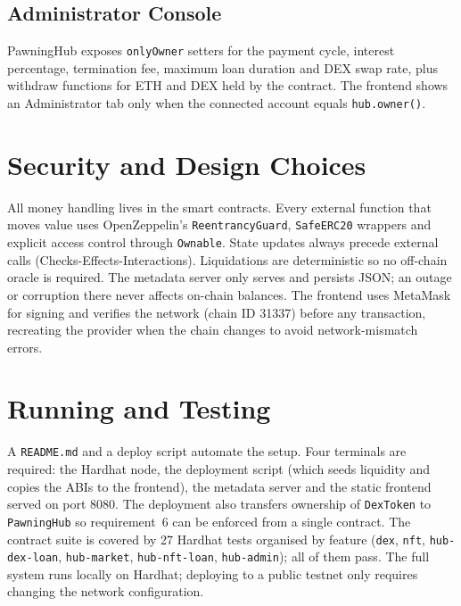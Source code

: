 \documentclass[12pt,a4paper]{article}
\begin{document}
\subsection{Administrator Console}
PawningHub exposes \texttt{onlyOwner} setters for the payment cycle, interest percentage, termination fee, maximum loan duration and DEX swap rate, plus withdraw functions for ETH and DEX held by the contract. The frontend shows an Administrator tab only when the connected account equals \texttt{hub.owner()}.

\section{Security and Design Choices}

All money handling lives in the smart contracts. Every external function that moves value uses OpenZeppelin's \texttt{ReentrancyGuard}, \texttt{SafeERC20} wrappers and explicit access control through \texttt{Ownable}. State updates always precede external calls (Checks-Effects-Interactions). Liquidations are deterministic so no off-chain oracle is required. The metadata server only serves and persists JSON; an outage or corruption there never affects on-chain balances. The frontend uses MetaMask for signing and verifies the network (chain ID 31337) before any transaction, recreating the provider when the chain changes to avoid network-mismatch errors.

\section{Running and Testing}

A \texttt{README.md} and a deploy script automate the setup. Four terminals are required: the Hardhat node, the deployment script (which seeds liquidity and copies the ABIs to the frontend), the metadata server and the static frontend served on port 8080. The deployment also transfers ownership of \texttt{DexToken} to \texttt{PawningHub} so requirement~6 can be enforced from a single contract. The contract suite is covered by 27 Hardhat tests organised by feature (\texttt{dex}, \texttt{nft}, \texttt{hub-dex-loan}, \texttt{hub-market}, \texttt{hub-nft-loan}, \texttt{hub-admin}); all of them pass. The full system runs locally on Hardhat; deploying to a public testnet only requires changing the network configuration.
\end{document}
